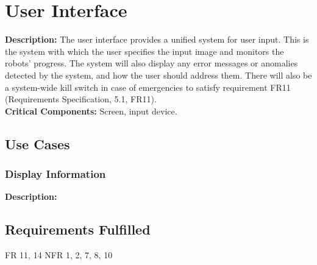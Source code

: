 
\section{User Interface}
\label{sec:user_interface}
\textbf{Description:} The user interface provides a unified system for user input. This is the system with which the user specifies the input image and monitors the robots' progress. The system will also display any error messages or anomalies detected by the system, and how the user should address them. There will also be a system-wide kill switch in case of emergencies to satisfy requirement FR11 (Requirements Specification, 5.1, FR11). \\

\noindent
\textbf{Critical Components:} Screen, input device. 

\subsection{Use Cases}
\subsubsection{Display Information}
\textbf{Description:} 

\subsection{Requirements Fulfilled}
FR 11, 14
NFR 1, 2, 7, 8, 10